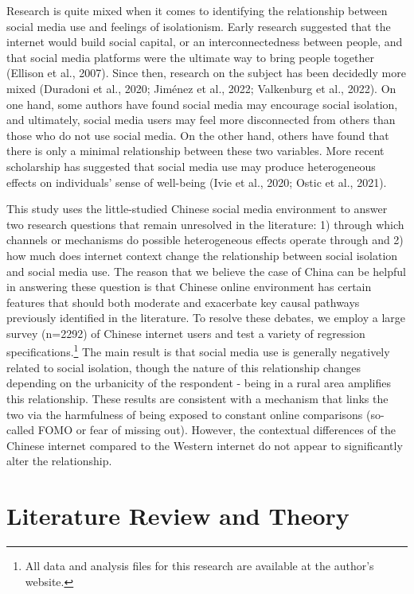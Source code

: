 \documentclass[]{interact}
\theoremstyle{plain}%
\theoremstyle{definition}
\theoremstyle{remark}
\begin{document}
Research is quite mixed when it comes to identifying the relationship
between social media use and feelings of isolationism. Early research
suggested that the internet would build social capital, or an
interconnectedness between people, and that social media platforms were
the ultimate way to bring people together (Ellison et al., 2007). Since
then, research on the subject has been decidedly more mixed (Duradoni et
al., 2020; Jiménez et al., 2022; Valkenburg et al., 2022). On one hand,
some authors have found social media may encourage social isolation, and
ultimately, social media users may feel more disconnected from others
than those who do not use social media. On the other hand, others have
found that there is only a minimal relationship between these two
variables. More recent scholarship has suggested that social media use
may produce heterogeneous effects on individuals' sense of well-being
(Ivie et al., 2020; Ostic et al., 2021).

This study uses the little-studied Chinese social media environment to
answer two research questions that remain unresolved in the literature:
1) through which channels or mechanisms do possible heterogeneous
effects operate through and 2) how much does internet context change the
relationship between social isolation and social media use. The reason
that we believe the case of China can be helpful in answering these
question is that Chinese online environment has certain features that
should both moderate and exacerbate key causal pathways previously
identified in the literature. To resolve these debates, we employ a
large survey (n=2292) of Chinese internet users and test a variety of
regression specifications.\footnote{All data and analysis files for this
  research are available at the author's website.} The main result is
that social media use is generally negatively related to social
isolation, though the nature of this relationship changes depending on
the urbanicity of the respondent - being in a rural area amplifies this
relationship. These results are consistent with a mechanism that links
the two via the harmfulness of being exposed to constant online
comparisons (so-called FOMO or fear of missing out). However, the
contextual differences of the Chinese internet compared to the Western
internet do not appear to significantly alter the relationship.

\hypertarget{literature-review-and-theory}{%
\section{Literature Review and
Theory}\label{literature-review-and-theory}}
\end{document}
